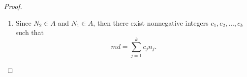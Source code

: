 \documentclass[12pt]{article}
\begin{document}
\begin{proof}
\begin{enumerate}
            For simplicity \( d' = d = \gcd(n_1, \dots, n_k) \).
            Rearrange the terms in the representation of \( d = b_1 m_1
            + \cdots + b_j m_j = a_1 n_1 + \cdots + a_k n_k \) so that
            the terms with positive coefficients are written first.
            Thus \( d = N_1 - N_2 \) with \( N_1 \in A \) and \( N_2 \in
            A \). Let \( M \) be the positive integer \( N_2^2/d \).
            Every integer \( m \ge M \) can be written as \( m = M + K =
            N_2^2/d + K \), with \( K \ge 0 \).  Using the Division
            Algorithm \( K = q' N_2/d + b \) with \( 0 \le b < N_2/d \)
            and the integer \( q' = \lfloor (N_2/d)/k \rfloor \).  Now \(
            md = N_2^2 + (q' N_2/d + b) d = N_2(N_2 + j -b ) + b N_1 \).
        \item
            Since \( N_2 \in A \) and \( N_1 \in A \), then there exist
            nonnegative integers \( c_1, c_2, \dots, c_k \) such that
            \[
                md = \sum\limits_{j=1}^k c_j n_j.
            \]
    \end{enumerate}
\end{proof}
\end{document}

